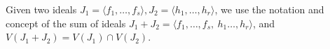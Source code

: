 


Given two ideals $J_1 = \langle f_1,\dots,f_s\rangle, J_2=\langle
h_1,\dots,h_r\rangle$, we use the notation and concept of the sum of
ideals $J_1 + J_2 = \langle
f_1,\dots,f_s,~h_1\dots,h_r\rangle$, and $V(J_1 + J_2) = V(J_1)
\cap V(J_2)$. 






